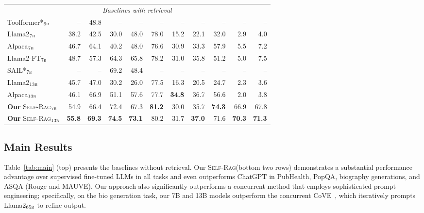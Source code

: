 \documentclass{article} %
\newcommand{\model}{\textsc{Self-Rag}\xspace}
\begin{document}
\begin{table}[t!]
\begin{tabular}{lrrrrrrrrrr}
\multicolumn{11}{c}{\it Baselines with retrieval} \\
Toolformer*$_{\textsc{6b}}$  & -- & 48.8  & -- & -- & -- & --  & -- & -- & -- & --  \\ 
Llama2$_{\textsc{7b}}$  & 38.2  & 42.5 & 30.0 & 48.0 & 78.0 & 15.2 & 22.1 & 32.0 & 2.9 & 4.0 \\
Alpaca$_{\textsc{7b}}$   & 46.7 & 64.1  & 40.2 & 48.0 & 76.6  & 30.9 & 33.3 & 57.9 & 5.5 & 7.2 \\
Llama2-FT$_{\textsc{7b}}$  & 48.7 & 57.3 & 64.3 & 65.8& {78.2} & 31.0 & 35.8 & 51.2 & 5.0 & 7.5 \\
SAIL*$_{\textsc{7b}}$  &  -- & -- & 69.2 & 48.4 & -- & --  & -- & -- & -- & --  \\ 
Llama2$_{\textsc{13b}}$  &  45.7  & 47.0 & 30.2  & 26.0 & 77.5  & 16.3 & 20.5 & 24.7 & 2.3 & 3.6  \\
Alpaca$_{\textsc{13b}}$ & 46.1& {66.9}  &  51.1 & 57.6 & 77.7 & {\bf 34.8} & 36.7 & 56.6 & 2.0 & 3.8 \\
\hdashline
{\bf Our }\model$_{\textsc{7b}}$ &{  54.9} &  66.4  & { 72.4} & 67.3 & {\bf 81.2} & 30.0 & 35.7 & {\bf 74.3} & {66.9} & { 67.8} \\
{\bf Our }\model$_{\textsc{13b}}$  &  {\bf 55.8} & {\bf 69.3} & {\bf 74.5} & {\bf 73.1} &  80.2 & 31.7 & {\bf 37.0} & { 71.6} & {\bf 70.3} & {\bf 71.3} \\
\bottomrule
\end{tabular}
\end{table}


\subsection{Main Results} 
Table~\ref{tab:main} (top) presents the baselines without retrieval. 
Our \model (bottom two rows) demonstrates a substantial performance advantage over supervised fine-tuned LLMs in all tasks and even outperforms ChatGPT in PubHealth, PopQA, biography generations, and ASQA (Rouge and MAUVE). 
Our approach also significantly outperforms a concurrent method that employs sophisticated prompt engineering; specifically, on the bio generation task, our 7B and 13B models outperform the concurrent CoVE~\citep{dhuliawala2023chainofverification}, which iteratively prompts Llama2$_\textsc{65b}$ to refine output. 
\end{document}
